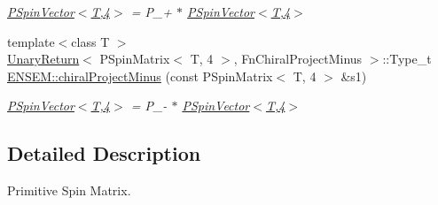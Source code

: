\begin{DoxyCompactItemize}
\begin{DoxyCompactList}\small\item\em \mbox{\hyperlink{classENSEM_1_1PSpinVector_3_01T_00_014_01_4}{P\+Spin\+Vector$<$\+T,4$>$}} = P\+\_\++ $\ast$ \mbox{\hyperlink{classENSEM_1_1PSpinVector_3_01T_00_014_01_4}{P\+Spin\+Vector$<$\+T,4$>$}} \end{DoxyCompactList}\item 
{\footnotesize template$<$class T $>$ }\\\mbox{\hyperlink{structUnaryReturn}{Unary\+Return}}$<$ P\+Spin\+Matrix$<$ T, 4 $>$, Fn\+Chiral\+Project\+Minus $>$\+::Type\+\_\+t \mbox{\hyperlink{group__primspinmatrix_ga6f9b4b2c70376b17548850f503a8c393}{E\+N\+S\+E\+M\+::chiral\+Project\+Minus}} (const P\+Spin\+Matrix$<$ T, 4 $>$ \&s1)
\begin{DoxyCompactList}\small\item\em \mbox{\hyperlink{classENSEM_1_1PSpinVector_3_01T_00_014_01_4}{P\+Spin\+Vector$<$\+T,4$>$}} = P\+\_\+-\/ $\ast$ \mbox{\hyperlink{classENSEM_1_1PSpinVector_3_01T_00_014_01_4}{P\+Spin\+Vector$<$\+T,4$>$}} \end{DoxyCompactList}\end{DoxyCompactItemize}


\subsection{Detailed Description}
Primitive Spin Matrix. 

